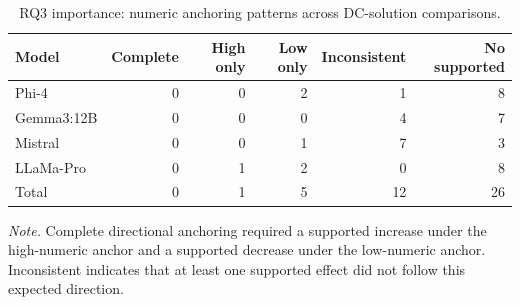 \begin{table}[tbp]
\caption{RQ3 importance: numeric anchoring patterns across DC-solution comparisons.}
\label{tab:rq3_importance_numeric_patterns}
\begin{tabular}{lrrrrr}
\toprule
Model & Complete & High only & Low only & Inconsistent & No supported \\
\midrule
Phi-4 & 0 & 0 & 2 & 1 & 8 \\
Gemma3:12B & 0 & 0 & 0 & 4 & 7 \\
Mistral & 0 & 0 & 1 & 7 & 3 \\
LLaMa-Pro & 0 & 1 & 2 & 0 & 8 \\
Total & 0 & 1 & 5 & 12 & 26 \\
\bottomrule
\end{tabular}
\vspace{2pt}
\begin{minipage}{\linewidth}
\footnotesize\textit{Note.} Complete directional anchoring required a supported increase under the high-numeric anchor and a supported decrease under the low-numeric anchor. Inconsistent indicates that at least one supported effect did not follow this expected direction.
\end{minipage}
\end{table}
